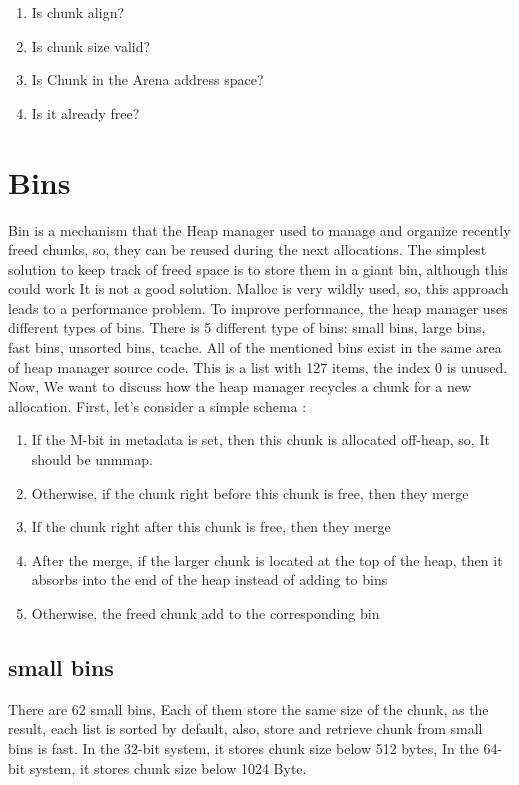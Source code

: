 \documentclass{masterthesis}
\newcommand*\tch{tcache}
\newcommand*\fb{fast bins}
\newcommand*\ub{unsorted bins}
\newcommand*\lb{large bins}
\newcommand*\sbs{small bins}
\begin{document}
\begin{enumerate}
	\item Is chunk align? 
	\item Is chunk size valid?
	\item Is Chunk in the Arena address space?
	\item Is it already free?
\end{enumerate}

\section{Bins}
	Bin is a mechanism that the Heap manager used to manage and organize recently freed chunks, so, they can be reused during the next allocations. The simplest solution to keep track of freed space is to store them in a giant bin, although this could work It is not a good solution. Malloc is very wildly used, so, this approach leads to a performance problem.
To improve performance, the heap manager uses different types of bins. There is 5 different type of bins: \sbs{}, \lb{}, \fb{}, \ub{}, \tch{}. All of the mentioned bins exist in the same area of heap manager source code. This is a list with 127 items, the index 0 is unused. 
Now, We want to discuss how the heap manager recycles a chunk for a new allocation. First, let's consider a simple schema :
\begin{enumerate}
	\item If the M-bit in metadata is set, then this chunk is allocated off-heap, so, It should be unmmap.
	\item Otherwise, if the chunk right before this chunk is free, then they merge
	\item If the chunk right after this chunk is free, then they merge
	\item After the merge, if the larger chunk is located at the top of the heap, then it absorbs into the end of the heap instead of adding to bins
	\item Otherwise, the freed chunk add to the corresponding bin
\end{enumerate}

\subsection{\sbs{}}
There are 62 \sbs{}, Each of them store the same size of the chunk, as the result, each list is sorted by default, also, store and retrieve chunk from \sbs{} is fast. In the 32-bit system, it stores chunk size below 512 bytes, In the 64-bit system, it stores chunk size below 1024 Byte. 
\end{document}
